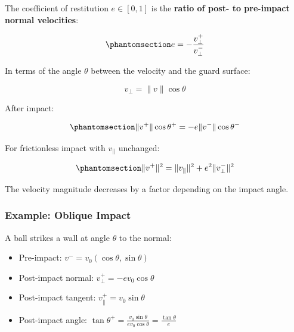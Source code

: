 \documentclass[
  letterpaper,
  DIV=11,
  numbers=noendperiod]{scrartcl}
\providecommand{\tightlist}{%
  \setlength{\itemsep}{0pt}\setlength{\parskip}{0pt}}\usepackage{longtable,booktabs,array}
\begin{document}
\begin{tcolorbox}[enhanced jigsaw, coltitle=black, titlerule=0mm, toprule=.15mm, opacitybacktitle=0.6, left=2mm, opacityback=0, rightrule=.15mm, leftrule=.75mm, breakable, colframe=quarto-callout-tip-color-frame, bottomtitle=1mm, toptitle=1mm, arc=.35mm, title=\textcolor{quarto-callout-tip-color}{\faLightbulb}\hspace{0.5em}{Geometric Definition of Restitution}, bottomrule=.15mm, colback=white, colbacktitle=quarto-callout-tip-color!10!white]

The coefficient of restitution \(e \in [0, 1]\) is the \textbf{ratio of
post- to pre-impact normal velocities}:

\begin{equation}\phantomsection\label{eq-restitution-geometric}{
e = -\frac{v_{\perp}^+}{v_{\perp}^-}
}\end{equation}

In terms of the angle \(\theta\) between the velocity and the guard
surface:

\[
v_\perp = \|v\| \cos\theta
\]

After impact:

\begin{equation}\phantomsection\label{eq-restitution-angle}{
\|v^+\| \cos\theta^+ = -e \|v^-\| \cos\theta^-
}\end{equation}

For frictionless impact with \(v_\parallel\) unchanged:

\begin{equation}\phantomsection\label{eq-post-impact-speed}{
\|v^+\|^2 = \|v_\parallel\|^2 + e^2 \|v_\perp^-\|^2
}\end{equation}

The velocity magnitude decreases by a factor depending on the impact
angle.

\end{tcolorbox}

\subsubsection{Example: Oblique Impact}\label{example-oblique-impact}

A ball strikes a wall at angle \(\theta\) to the normal:

\begin{itemize}
\tightlist
\item
  Pre-impact: \(v^- = v_0(\cos\theta, \sin\theta)\)
\item
  Post-impact normal: \(v_\perp^+ = -e v_0 \cos\theta\)
\item
  Post-impact tangent: \(v_\parallel^+ = v_0 \sin\theta\)
\item
  Post-impact angle:
  \(\tan\theta^+ = \frac{v_0 \sin\theta}{e v_0 \cos\theta} = \frac{\tan\theta}{e}\)
\end{itemize}
\end{document}
